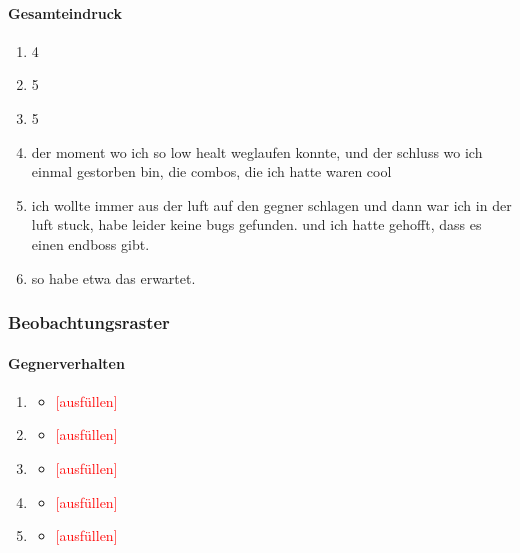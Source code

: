 \documentclass[../Main.tex]{subfiles}
\begin{document}
\paragraph{Gesamteindruck}
\begin{enumerate}[label=\textbf{Q\arabic*}, leftmargin=1.5cm, itemsep=0.5em, resume]
    \item 4
    \item 5
    \item 5
    \item der moment wo ich so low healt weglaufen konnte, und der schluss wo ich einmal gestorben bin, die combos, die ich hatte waren cool
    \item ich wollte immer aus der luft auf den gegner schlagen und dann war ich in der luft stuck, habe leider keine bugs gefunden. und ich hatte gehofft, dass es einen endboss gibt.
    \item so habe etwa das erwartet.
\end{enumerate}

\subsubsection{Beobachtungsraster}

\paragraph{Gegnerverhalten}
\begin{enumerate}[label=\textbf{B\arabic*}, leftmargin=1.5cm, itemsep=0.8em]
    \item
        \begin{itemize}[nosep]
            \item \textcolor{red}{[ausfüllen]}
        \end{itemize}
    \item
        \begin{itemize}[nosep]
            \item \textcolor{red}{[ausfüllen]}
        \end{itemize}
    \item
        \begin{itemize}[nosep]
            \item \textcolor{red}{[ausfüllen]}
        \end{itemize}
    \item
        \begin{itemize}[nosep]
            \item \textcolor{red}{[ausfüllen]}
        \end{itemize}
    \item
        \begin{itemize}[nosep]
            \item \textcolor{red}{[ausfüllen]}
        \end{itemize}
\end{enumerate}
\end{document}
